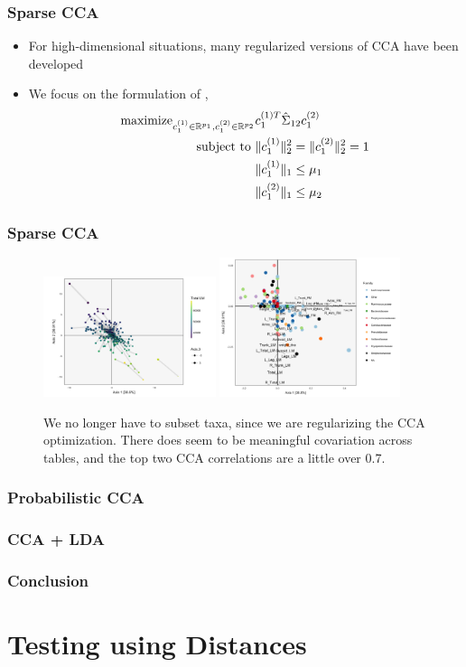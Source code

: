 \documentclass{beamer}
\begin{document}
\begin{frame}
  \frametitle{Sparse CCA}
  \begin{itemize}
  \item For high-dimensional situations, many regularized versions of CCA have
    been developed \citep{zou2006sparse, witten2009penalized, hardoon2011sparse,
      balakrishnan2012sparse}
  \item We focus on the formulation of \citep{witten2009penalized},
    \begin{align*}
  \text{maximize}_{c_{1}^{(1)} \in \mathbb{R}^{p_{1}}, c_{1}^{(2)} \in
    \mathbb{R}^{p_{2}}} & c_{1}^{(1) T}\hat{\Sigma}_{12}
  c_{1}^{(2)} \\
  \text{subject to } &\|c_{1}^{(1)}\|_{2}^{2} = \|c_{1}^{(2)}\|_{2}^{2} = 1 \\
  &\|c_{1}^{(1)}\|_{1} \leq \mu_{1} \\
  &\|c_{1}^{(2)}\|_{1} \leq \mu_{2}
    \end{align*}
  \end{itemize}
\end{frame}

\begin{frame}
  \frametitle{Sparse CCA}
  \begin{figure}[ht]
    \centering
    \includegraphics[width=0.45\textwidth]{figure/pmd_scores_lm}
    \includegraphics[width=0.47\textwidth]{figure/pmd_loadings}
    \caption{We no longer have to subset taxa, since we are regularizing the CCA
      optimization. There does seem to be meaningful covariation across tables,
      and the top two CCA correlations are a little over
      0.7. \label{fig:pmd_scores}}
  \end{figure}
\end{frame}

\begin{frame}
  \frametitle{Probabilistic CCA}
\end{frame}

\begin{frame}
  \frametitle{CCA + LDA}
\end{frame}

\begin{frame}
  \frametitle{Conclusion}

\end{frame}



\section{Testing using Distances}
\label{sec:testing_distances}
\end{document}
